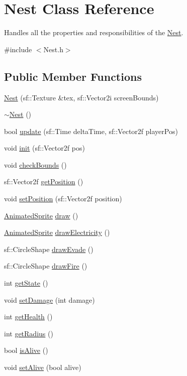 \hypertarget{class_nest}{}\section{Nest Class Reference}
\label{class_nest}


Handles all the properties and responsibilities of the \hyperlink{class_nest}{Nest}.  




{\ttfamily \#include $<$Nest.\+h$>$}

\subsection*{Public Member Functions}
\begin{DoxyCompactItemize}
\item 
\hyperlink{class_nest_af88d2bfa6f9d0b0c48982ff54fe31cf9}{Nest} (sf\+::\+Texture \&tex, sf\+::\+Vector2i screen\+Bounds)
\item 
\hyperlink{class_nest_a3e879ba15acd31717b1dc9bdc87488d5}{$\sim$\+Nest} ()
\item 
bool \hyperlink{class_nest_a90efe6e30a891f7dd0620d4f14c3cef6}{update} (sf\+::\+Time delta\+Time, sf\+::\+Vector2f player\+Pos)
\item 
void \hyperlink{class_nest_a1b243050144c8b5200bd3e8a4370565a}{init} (sf\+::\+Vector2f pos)
\item 
void \hyperlink{class_nest_ad3c58a10bcb55df97a6d0e7923924f0b}{check\+Bounds} ()
\item 
sf\+::\+Vector2f \hyperlink{class_nest_a3904c58d1826997b98bdfd8b357ba6fa}{get\+Position} ()
\item 
void \hyperlink{class_nest_a483c559f957838c28d613fddad8b99f3}{set\+Position} (sf\+::\+Vector2f position)
\item 
\hyperlink{class_animated_sprite}{Animated\+Sprite} \hyperlink{class_nest_a6e4950498b1c767c513e1a5fac4259e5}{draw} ()
\item 
\hyperlink{class_animated_sprite}{Animated\+Sprite} \hyperlink{class_nest_ad90f39c39a435c3cb2702880b624d254}{draw\+Electricity} ()
\item 
sf\+::\+Circle\+Shape \hyperlink{class_nest_a69a224e6296dadbeee744697d308259c}{draw\+Evade} ()
\item 
sf\+::\+Circle\+Shape \hyperlink{class_nest_a3118b2257f6864632abf907c42af94fd}{draw\+Fire} ()
\item 
int \hyperlink{class_nest_a730a5f41978e51fc1a10093014c464f5}{get\+State} ()
\item 
void \hyperlink{class_nest_a2a5904049fbb094af9f79ec55a5be9d6}{set\+Damage} (int damage)
\item 
int \hyperlink{class_nest_a31a181f820acdcc53c5c0954ec57bdd2}{get\+Health} ()
\item 
int \hyperlink{class_nest_a83653533eadad995b464a8a068257fe8}{get\+Radius} ()
\item 
bool \hyperlink{class_nest_a3f0d0175e349409ef2cab7e9bae0fb81}{is\+Alive} ()
\item 
void \hyperlink{class_nest_a122840333f4f0d0f5acd2815b0f633ca}{set\+Alive} (bool alive)
\end{DoxyCompactItemize}


